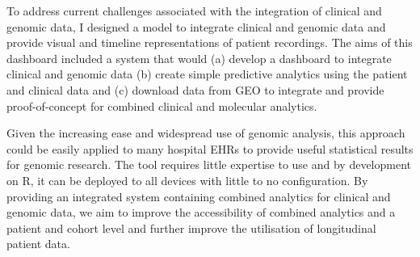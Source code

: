 \documentclass{bioinfo}
\begin{document}
To address current challenges associated with the integration of clinical and genomic data, I designed a model to integrate clinical and genomic data and provide visual and timeline representations of patient recordings. The aims of this dashboard included a system that would (a) develop a dashboard to integrate clinical and genomic data (b) create simple predictive analytics using the patient and clinical data and (c) download data from GEO to integrate and provide proof-of-concept for combined clinical and molecular analytics. 

Given the increasing ease and widespread use of genomic analysis, this approach could be easily applied to many hospital EHRs to provide useful statistical results for genomic research. The tool requires little expertise to use and by development on R, it can be deployed to all devices with little to no configuration. By providing an integrated system containing combined analytics for clinical and genomic data, we aim to improve the accessibility of combined analytics and a patient and cohort level and further improve the utilisation of longitudinal patient data. 
\end{document}
